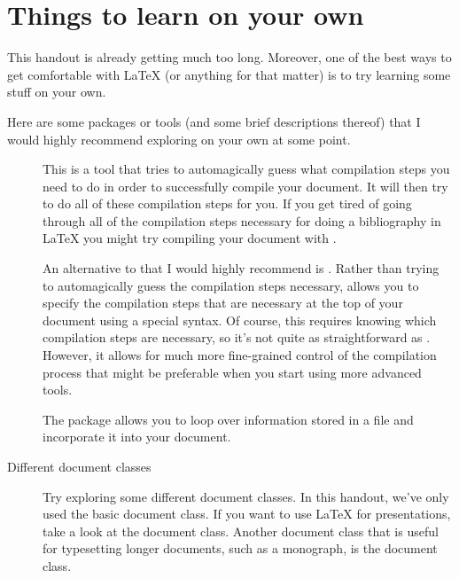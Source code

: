 
\section{Things to learn on your own}
\label{sec:things-to-learn-on-your-own}

This handout is already getting much too long.
Moreover, one of the best ways to get comfortable with \LaTeX{} (or anything for that matter) is to try learning some stuff on your own.

Here are some packages or tools (and some brief descriptions thereof) that I would highly recommend exploring on your own at some point.

\begin{description}

	\item[]{%
		This is a tool that tries to automagically guess what compilation steps you need to do in order to successfully compile your document.
		It will then try to do all of these compilation steps for you.
		If you get tired of going through all of the compilation steps necessary for doing a bibliography in \LaTeX{} you might try compiling your document with \href{https://www.ctan.org/pkg/latexmk}{}.%
	}

	\item[]{%
		An alternative to  that I would highly recommend is \href{https://www.ctan.org/pkg/arara}{}.
		Rather than trying to automagically guess the compilation steps necessary,  allows you to specify the compilation steps that are necessary at the top of your document using a special syntax.
		Of course, this requires knowing which compilation steps are necessary, so it's not quite as straightforward as .
		However, it allows for much more fine-grained control of the compilation process that might be preferable when you start using more advanced tools.%
	}

	\item[]{%
		The \href{https://www.ctan.org/pkg/datatool}{} package allows you to loop over information stored in a  file and incorporate it into your  document.%
	}

	\item[Different document classes]{%
		Try exploring some different document classes.
		In this handout, we've only used the basic  document class.
		If you want to use \LaTeX{} for presentations, take a look at the \href{https://ctan.org/pkg/beamer}{} document class.
		Another document class that is useful for typesetting longer documents, such as a monograph, is the \href{https://ctan.org/pkg/memoir}{} document class.%
	}


\end{description}

